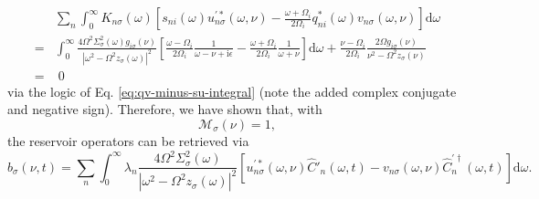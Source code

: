 \begin{equation}
\begin{split}
&\sum_n\int_0^\infty K_{n\sigma}(\omega)\left[s_{ni}(\omega)u^{\prime*}_{n\sigma}(\omega,\nu) - \frac{\omega + \Omega_i}{2\Omega_i}q_{ni}^*(\omega)v_{n\sigma}(\omega,\nu)\right]\mathrm{d}\omega\\
= &\int_0^\infty\frac{4\Omega^2\Sigma_\sigma^2(\omega)g_{i\sigma}(\nu)}{|\omega^2 - \Omega^2z_\sigma(\omega)|^2}\left[\frac{\omega - \Omega_i}{2\Omega_i}\frac{1}{\omega - \nu  + \mathrm{i}\epsilon} - \frac{\omega + \Omega_i}{2\Omega_i}\frac{1}{\omega + \nu }\right]\mathrm{d}\omega + \frac{\nu  - \Omega_i}{2\Omega_i}\frac{2\Omega g_{i\sigma}(\nu)}{\nu ^2 - \Omega^2z_\sigma(\nu )}\\
= &\;0
\end{split}
\end{equation}
via the logic of Eq. \eqref{eq:qv-minus-su-integral} (note the added complex conjugate and negative sign). Therefore, we have shown that, with
\begin{equation}
\mathcal{M}_\sigma(\nu) = 1,
\end{equation}
the reservoir operators can be retrieved via
\begin{equation}
\hat{b}_\sigma(\nu,t) = \sum_n\int_0^\infty\lambda_n\frac{4\Omega^2\Sigma_\sigma^2(\omega)}{|\omega^2 - \Omega^2z_\sigma(\omega)|^2}\left[u^{\prime*}_{n\sigma}(\omega,\nu)\hat{C}'_n(\omega,t) - v_{n\sigma}(\omega,\nu)\hat{C}^{\prime\dagger}_n(\omega,t)\right]\mathrm{d}\omega.
\end{equation}
